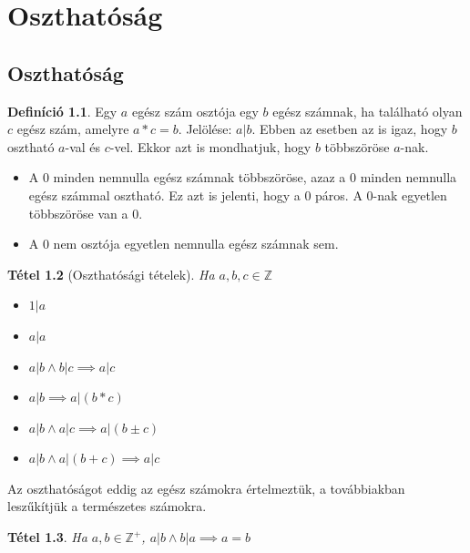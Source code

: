 \documentclass[twoside,12pt]{report}
\newtheorem{theorem}{Tétel}[section]
\theoremstyle{definition}
\newtheorem{definition}[theorem]{Definíció}
\begin{document}
\chapter{Oszthatóság}
\section{Oszthatóság}
	\begin{definition}
		Egy $a$ egész szám osztója egy $b$ egész számnak, ha található olyan $c$ egész szám,
		amelyre $a*c=b$. Jelölése: $a\vert b$. Ebben az esetben az is igaz, hogy $b$ osztható $a$-val és $c$-vel. Ekkor azt is mondhatjuk, hogy $b$ többszöröse $a$-nak.
	\end{definition}
	\begin{itemize}
		\item A 0 minden nemnulla egész számnak többszöröse, azaz a 0 minden nemnulla egész számmal osztható. Ez azt is jelenti, hogy a 0 páros. A 0-nak egyetlen többszöröse van a 0.
		\item A 0 nem osztója egyetlen nemnulla egész számnak sem.
	\end{itemize}
	\begin{theorem}[Oszthatósági tételek]
		Ha $a,b,c\in\mathbb{Z}$
		\begin{itemize}
			\item $1\vert a$
			\item $a\vert a$
			\item $a\vert b\wedge b\vert c\implies a\vert c$
			\item $a\vert b\implies a\vert(b*c)$
			\item $a\vert b\wedge a\vert c\implies a\vert (b\pm c)$
			\item $a\vert b\wedge a\vert (b+c)\implies a\vert c$
		\end{itemize}
	\end{theorem}
	Az oszthatóságot eddig az egész számokra értelmeztük, a továbbiakban leszűkítjük a természetes számokra.
	\begin{theorem}
		Ha $a, b\in \mathbb{Z}^+$, $a\vert b\wedge b\vert a\implies a=b$
	\end{theorem}
	\noindent
\end{document}
